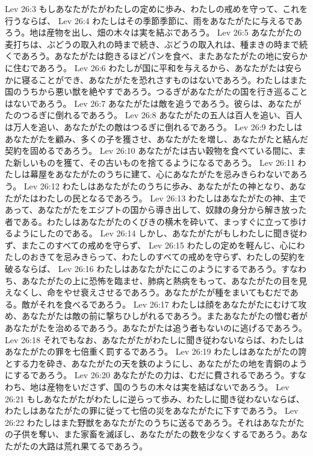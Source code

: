 Lev 26:3  もしあなたがたがわたしの定めに歩み、わたしの戒めを守って、これを行うならば、
Lev 26:4  わたしはその季節季節に、雨をあなたがたに与えるであろう。地は産物を出し、畑の木々は実を結ぶであろう。
Lev 26:5  あなたがたの麦打ちは、ぶどうの取入れの時まで続き、ぶどうの取入れは、種まきの時まで続くであろう。あなたがたは飽きるほどパンを食べ、またあなたがたの地に安らかに住むであろう。
Lev 26:6  わたしが国に平和を与えるから、あなたがたは安らかに寝ることができ、あなたがたを恐れさすものはないであろう。わたしはまた国のうちから悪い獣を絶やすであろう。つるぎがあなたがたの国を行き巡ることはないであろう。
Lev 26:7  あなたがたは敵を追うであろう。彼らは、あなたがたのつるぎに倒れるであろう。
Lev 26:8  あなたがたの五人は百人を追い、百人は万人を追い、あなたがたの敵はつるぎに倒れるであろう。
Lev 26:9  わたしはあなたがたを顧み、多くの子を獲させ、あなたがたを増し、あなたがたと結んだ契約を固めるであろう。
Lev 26:10  あなたがたは古い穀物を食べている間に、また新しいものを獲て、その古いものを捨てるようになるであろう。
Lev 26:11  わたしは幕屋をあなたがたのうちに建て、心にあなたがたを忌みきらわないであろう。
Lev 26:12  わたしはあなたがたのうちに歩み、あなたがたの神となり、あなたがたはわたしの民となるであろう。
Lev 26:13  わたしはあなたがたの神、主であって、あなたがたをエジプトの国から導き出して、奴隷の身分から解き放った者である。わたしはあなたがたのくびきの横木を砕いて、まっすぐに立って歩けるようにしたのである。
Lev 26:14  しかし、あなたがたがもしわたしに聞き従わず、またこのすべての戒めを守らず、
Lev 26:15  わたしの定めを軽んじ、心にわたしのおきてを忌みきらって、わたしのすべての戒めを守らず、わたしの契約を破るならば、
Lev 26:16  わたしはあなたがたにこのようにするであろう。すなわち、あなたがたの上に恐怖を臨ませ、肺病と熱病をもって、あなたがたの目を見えなくし、命をやせ衰えさせるであろう。あなたがたが種をまいてもむだである。敵がそれを食べるであろう。
Lev 26:17  わたしは顔をあなたがたにむけて攻め、あなたがたは敵の前に撃ちひしがれるであろう。またあなたがたの憎む者があなたがたを治めるであろう。あなたがたは追う者もないのに逃げるであろう。
Lev 26:18  それでもなお、あなたがたがわたしに聞き従わないならば、わたしはあなたがたの罪を七倍重く罰するであろう。
Lev 26:19  わたしはあなたがたの誇とする力を砕き、あなたがたの天を鉄のようにし、あなたがたの地を青銅のようにするであろう。
Lev 26:20  あなたがたの力は、むだに費されるであろう。すなわち、地は産物をいださず、国のうちの木々は実を結ばないであろう。
Lev 26:21  もしあなたがたがわたしに逆らって歩み、わたしに聞き従わないならば、わたしはあなたがたの罪に従って七倍の災をあなたがたに下すであろう。
Lev 26:22  わたしはまた野獣をあなたがたのうちに送るであろう。それはあなたがたの子供を奪い、また家畜を滅ぼし、あなたがたの数を少なくするであろう。あなたがたの大路は荒れ果てるであろう。
